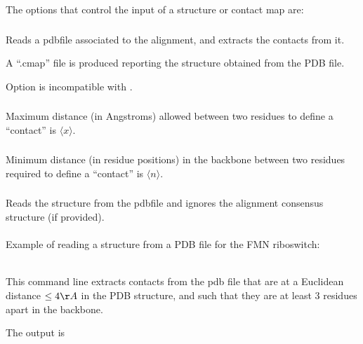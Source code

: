 \vspace{2mm}
\noindent
The options that control the input of a structure or contact map are:

\subsubsection{} Reads a pdbfile associated to the alignment, and extracts the contacts
from it.

A ``.cmap'' file is produced reporting the structure obtained from the PDB file.

Option  is incompatible with .

\subsubsection{} Maximum distance (in Angstroms) allowed between two residues to define a ``contact'' is $\langle x\rangle$.

\subsubsection{} Minimum distance (in residue positions) in the backbone between two residues required to define a ``contact'' is $\langle n\rangle$.
\vspace{5mm}

\subsubsection{} Reads the structure from the pdbfile and ignores the alignment consensus structure (if provided).\\\\

\noindent
Example of reading a structure from a PDB file for the FMN riboswitch:

\\

\noindent
This command line extracts contacts from the pdb file that are at a
Euclidean distance $\leq 4 \AA$ in the PDB structure, and such that
they are at least 3 residues apart in the backbone.


\noindent
The output is

